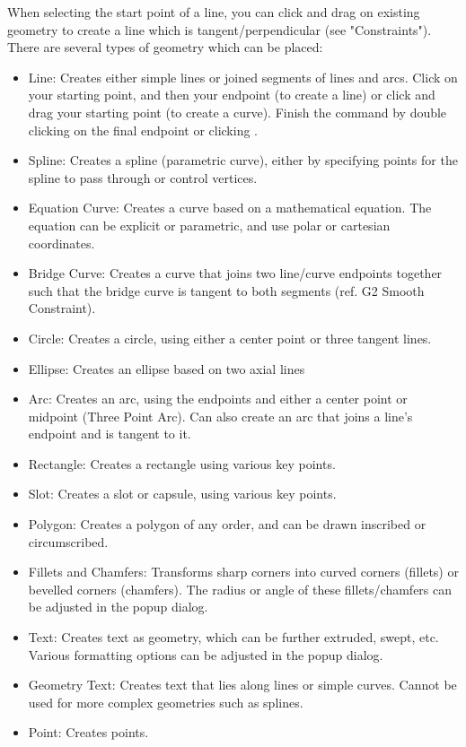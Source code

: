 When selecting the start point of a line, you can click and drag on existing geometry to create a line which is tangent/perpendicular (see "Constraints"). There are several types of geometry which can be placed:

\begin{itemize}
\item Line: Creates either simple lines or joined segments of lines and arcs. Click on your starting point, and then your endpoint (to create a line) or click and drag your starting point (to create a curve). Finish the command by double clicking on the final endpoint or clicking .
\item Spline: Creates a spline (parametric curve), either by specifying points for the spline to pass through or control vertices. 
\item Equation Curve: Creates a curve based on a mathematical equation. The equation can be explicit or parametric, and use polar or cartesian coordinates.
\item Bridge Curve: Creates a curve that joins two line/curve endpoints together such that the bridge curve is tangent to both segments (ref. G2 Smooth Constraint).
\item Circle: Creates a circle, using either a center point or three tangent lines.
\item Ellipse: Creates an ellipse based on two axial lines
\item Arc: Creates an arc, using the endpoints and either a center point or midpoint (Three Point Arc). Can also create an arc that joins a line's endpoint and is tangent to it.
\item Rectangle: Creates a rectangle using various key points.
\item Slot: Creates a slot or capsule, using various key points.
\item Polygon: Creates a polygon of any order, and can be drawn inscribed or circumscribed.
\item Fillets and Chamfers: Transforms sharp corners into curved corners (fillets) or bevelled corners (chamfers). The radius or angle of these fillets/chamfers can be adjusted in the popup dialog.
\item Text: Creates text as geometry, which can be further extruded, swept, etc. Various formatting options can be adjusted in the popup dialog.
\item Geometry Text: Creates text that lies along lines or simple curves. Cannot be used for more complex geometries such as splines.
\item Point: Creates points.

\end{itemize}

